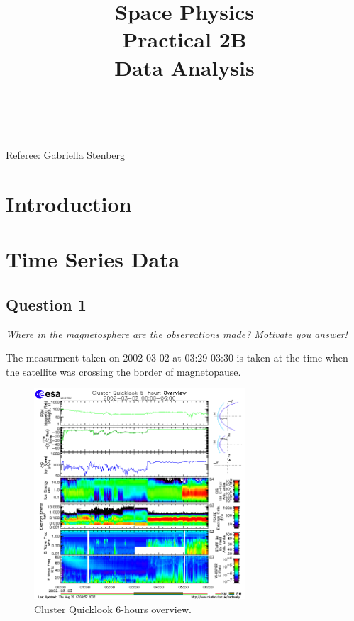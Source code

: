 \documentclass{article}
\title{\textbf {Space Physics} \\ Practical 2B\\ Data Analysis} %
\author{\authorivan\\\authoranu}
\begin{document}
\maketitle %

\centerline{Referee: Gabriella Stenberg}

\setlength\parindent{0pt} %

\renewcommand{\labelenumi}{\alph{enumi}} %
\clearpage

\tableofcontents

\listoffigures

\clearpage

\section{Introduction}

    

\section{Time Series Data}

\subsection{Question 1}
\textit{Where in the magnetosphere are the observations made? Motivate you
answer!}

The measurment taken on 2002-03-02 at 03:29-03:30 is taken at the time when the satellite was crossing the border of magnetopause.

\begin{figure}[htb!]
\centering
\includegraphics[width=0.7\textwidth]{Figures/cluster.png}
\caption{Cluster Quicklook 6-hours overview.}
\label{fig:cluster}
\end{figure}
\end{document}
